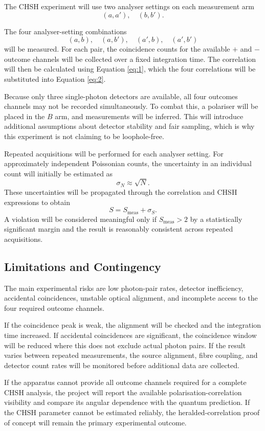 \documentclass{article}
\begin{document}
The CHSH experiment will use two analyser settings on each measurement arm
\[
    (a,a'),\quad(b,b').
\]

The four analyser-setting combinations
\[
    (a,b),\quad(a,b'),\quad(a',b),\quad(a',b')
\]
will be measured. For each pair, the coincidence counts for the available $+$ and $-$ outcome channels will be collected over a fixed integration time. The correlation will then be calculated using Equation \ref{eq:1}, which the four correlations will be substituted into Equation \ref{eq:2}.

Because only three single-photon detectors are available, all four outcomes channels may not be recorded simultaneously. To combat this, a polariser will be placed in the $B$ arm, and measurements will be inferred. This will introduce additional assumptions about detector stability and fair sampling, which is why this experiment is not claiming to be loophole-free.

Repeated acquisitions will be performed for each analyser setting. For approximately independent Poissonian counts, the uncertainty in an individual count will initially be estimated as
\[
    \sigma _N\approx\sqrt{N}.
\]
These uncertainties will be propagated through the correlation and CHSH expressions to obtain
\[
    S=S_{\text{meas}}+\sigma _S.
\]
A violation will be considered meaningful only if $S_{\text{meas}}>2$ by a statistically significant margin and the result is reasonably consistent across repeated acquisitions.

\subsection{Limitations and Contingency}
The main experimental risks are low photon-pair rates, detector inefficiency, accidental coincidences, unstable optical alignment, and incomplete access to the four required outcome channels.

If the coincidence peak is weak, the alignment will be checked and the integration time increased. If accidental coincidences are significant, the coincidence window will be reduced where this does not exclude actual photon pairs. If the result varies between repeated measurements, the source alignment, fibre coupling, and detector count rates will be monitored before additional data are collected.

If the apparatus cannot provide all outcome channels required for a complete CHSH analysis, the project will report the available polarisation-correlation visibility and compare its angular dependence with the quantum prediction. If the CHSH parameter cannot be estimated reliably, the heralded-correlation proof of concept will remain the primary experimental outcome.
\end{document}
